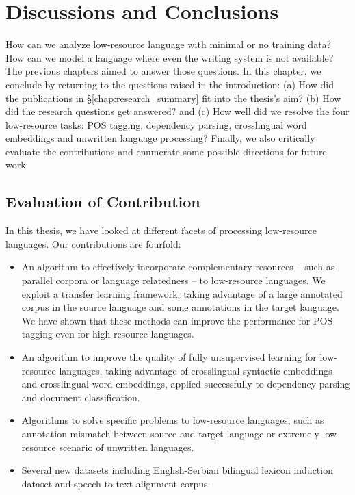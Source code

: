 \documentclass[12pt,twoside,final,hidelinks]{ltthesis}
\theoremstyle{definition}
\begin{document}



\chapter{Discussions and Conclusions}
\label{chap:conclusion}
How can we analyze low-resource language with minimal or no training data? How can we model a language where even the writing system is not available? The previous chapters aimed to answer those questions. 
In this chapter, we conclude by returning to the questions raised in the introduction: (a) How did the publications in \S\ref{chap:research_summary} fit into the thesis's aim? (b) How did the research questions get 
answered? and (c) How well did we resolve the four low-resource tasks: POS tagging, dependency parsing, crosslingual word embeddings and unwritten language processing? Finally, we also critically evaluate the contributions and enumerate some possible directions
for future work. 

\section{Evaluation of Contribution}
\label{sec:evaluation_contribution} 
In this thesis, we have looked at different facets of processing low-resource languages. Our contributions are fourfold: 
\begin{itemize}
\item An algorithm to effectively incorporate complementary resources -- such as parallel corpora or language relatedness -- to low-resource languages. We exploit a transfer learning framework, taking advantage of a large annotated corpus in the source language and some annotations in the target language. We have shown that these methods can improve 
the performance for POS tagging even for high resource languages. 
\item An algorithm to improve the quality of fully unsupervised learning for low-resource languages, taking advantage of crosslingual syntactic embeddings and crosslingual 
word embeddings, applied successfully to dependency parsing and document classification. 
\item Algorithms to solve specific problems to low-resource languages, such as annotation mismatch between source and target language or extremely low-resource scenario of unwritten languages.
\item Several new datasets including English-Serbian bilingual lexicon induction dataset and speech to text alignment corpus. 
\end{itemize}
\end{document}
